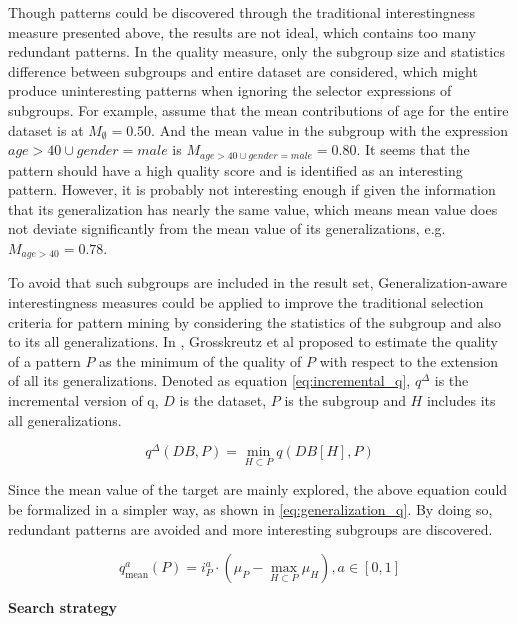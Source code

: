 Though patterns could be discovered through the traditional interestingness measure presented above, the results are not ideal, which contains too many redundant patterns. In the quality measure, only the subgroup size and statistics difference between subgroups and entire dataset are considered, which might produce uninteresting patterns when ignoring the selector expressions of subgroups. For example, assume that the mean contributions of age for the entire dataset is at $M_{\emptyset}=0.50$. And the mean value in the subgroup with the expression $age > 40 \cup gender=male$ is $M_{age > 40 \cup gender=male}=0.80$. It seems that the pattern should have a high quality score and is identified as an interesting pattern. However, it is probably not interesting enough if given the information that its generalization has nearly the same value, which means mean value does not deviate significantly from the mean value of its generalizations, e.g. $M_{age > 40} = 0.78$. 

To avoid that such subgroups are included in the result set, Generalization-aware interestingness measures could be applied to improve the traditional selection criteria for pattern mining by considering the statistics of the subgroup and also to its all generalizations. In \cite{grosskreutz2010subgroup}, Grosskreutz et al proposed to estimate the quality of a pattern $P$ as the minimum of the quality of $P$ with respect to the extension of all its generalizations. Denoted as equation \ref{eq:incremental_q}, $q^{\Delta}$ is the incremental version of q, $D$ is the dataset, $P$ is the subgroup and $H$ includes its all generalizations. 

 \begin{equation} \label{eq:incremental_q}
 q^{\Delta}(D B, P)=\min _{H \subset P} q\left(D B\left[H\right], P\right)
 \end{equation}
 
Since the mean value of the target are mainly explored, the above equation could be formalized in a simpler way, as shown in \ref{eq:generalization_q}. By doing so, redundant patterns are avoided and more interesting subgroups are discovered. 

\begin{equation} \label{eq:generalization_q}
q_{\operatorname{mean}}^{a}(P)=i_{P}^{a} \cdot\left(\mu_{P}-\max _{H \subset P} \mu_{H}\right), a \in[0,1]
\end{equation}

\textbf{Search strategy}


